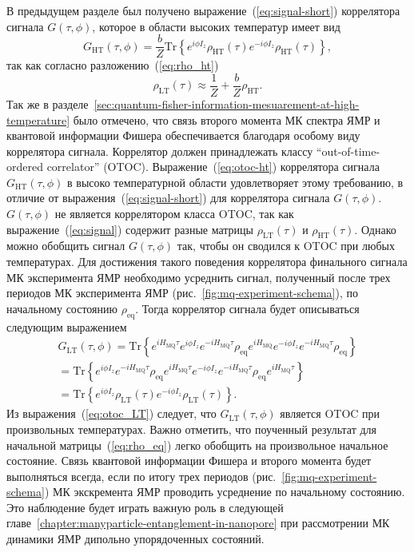 В предыдущем разделе был получено выражение~(\ref{eq:signal-short}) коррелятора сигнала $G(\tau, \phi)$,
которое в области высоких температур имеет вид
%
\begin{equation}
    \label{eq:otoc-ht}
    G_\mathrm{HT}(\tau, \phi) = \frac b Z\mathrm{Tr}\left\{
    e^{i \phi I_z}
    \rho_\mathrm{HT} (\tau)
    e^{-i \phi I_z}
    \rho_\mathrm{HT}(\tau)
    \right\},
\end{equation}
%
так как согласно разложению~(\ref{eq:rho_ht})
%
\begin{equation}
  \rho_\mathrm{LT} (\tau) \approx \frac 1 Z + \frac b Z \rho_\mathrm{HT}.
\end{equation}
%
Так же в разделе~\ref{sec:quantum-fisher-information-mesuarement-at-high-temperature}
было отмечено,
что связь второго момента МК спектра ЯМР и квантовой информации Фишера
обеспечивается благодаря особому виду коррелятора сигнала.
Коррелятор должен принадлежать классу ``out-of-time-ordered correlator'' (OTOC).
Выражение~(\ref{eq:otoc-ht}) коррелятора сигнала $G_\mathrm{HT}(\tau, \phi)$
в высоко температурной области
удовлетворяет этому требованию,
в отличие от выражения~(\ref{eq:signal-short}) для коррелятора сигнала $G(\tau, \phi)$.
$G(\tau, \phi)$ не является коррелятором класса OTOC,
так как выражение~(\ref{eq:signal}) содержит разные матрицы $\rho_\mathrm{LT}(\tau)$ и $\rho_\mathrm{HT}(\tau)$.
Однако можно обобщить сигнал $G(\tau, \phi)$ так, чтобы он сводился к OTOC при любых температурах.
Для достижения такого поведения коррелятора финального сигнала МК эксперимента ЯМР
необходимо усреднить сигнал,
полученный после трех периодов МК эксперимента ЯМР (рис.~\ref{fig:mq-experiment-schema}),
по начальному состоянию $\rho_\mathrm{eq}$.
Тогда коррелятор сигнала будет описываться следующим выражением
%
\begin{multline}
  \label{eq:otoc_LT}
  G_\mathrm{LT}(\tau, \phi) =
  \mathrm{Tr}\left\{
    e^{i H_{\mathrm{MQ}} \tau}
    e^{i \phi I_z}
    e^{-i H_{\mathrm{MQ}} \tau}
    \rho_{\mathrm{eq}}
    e^{i H_{\mathrm{MQ}}}
    e^{-i \phi I_z}
    e^{-i H_{\mathrm{MQ}} \tau}
    \rho_{\mathrm{eq}}
  \right\} \\ =
  \mathrm{Tr}\left\{
    e^{i \phi I_z}
    e^{-i H_\mathrm{MQ} \tau}
    \rho_\mathrm{eq}
    e^{i H_\mathrm{MQ} \tau}
    e^{-i \phi I_z}
    e^{-i H_\mathrm{MQ} \tau}
    \rho_{\mathrm{eq}}
    e^{i H_\mathrm{MQ} \tau}
  \right\} \\ =
  \mathrm{Tr}\left\{
    e^{i \phi I_z}
    \rho_\mathrm{LT} (\tau)
    e^{-i \phi I_z}
    \rho_\mathrm{LT} (\tau)
  \right\}.
\end{multline}
%
Из выражения~(\ref{eq:otoc_LT}) следует,
что $G_\mathrm{LT}(\tau, \phi)$ является OTOC при произвольных температурах.
Важно отметить,
что поученный результат для начальной матрицы~(\ref{eq:rho_eq}) легко обобщить
на произвольное начальное состояние.
Связь квантовой информации Фишера и второго момента будет выполняться всегда,
если по итогу трех периодов (рис.~\ref{fig:mq-experiment-schema}) МК экскремента ЯМР
проводить усреднение по начальному состоянию.
Это наблюдение будет играть важную роль в следующей главе~\ref{chapter:manyparticle-entanglement-in-nanopore}
при рассмотрении МК динамики ЯМР дипольно упорядоченных состояний.

